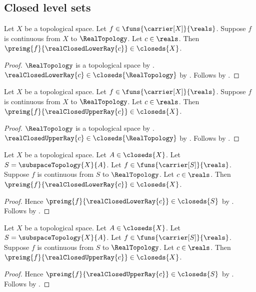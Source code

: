 \subsection{Closed level sets}

\begin{theorem}\label{continuous_closed_lower_level_set}
    Let $X$ be a topological space.
    Let $f\in\funs{\carrier[X]}{\reals}$.
    Suppose $f$ is continuous from $X$ to $\RealTopology$.
    Let $c\in\reals$.
    Then $\preimg{f}{\realClosedLowerRay{c}}\in\closeds{X}$.
\end{theorem}
\begin{proof}
    $\RealTopology$ is a topological space
        by .
    $\realClosedLowerRay{c}\in\closeds{\RealTopology}$
        by .
    Follows by .
\end{proof}

\begin{theorem}\label{continuous_closed_upper_level_set}
    Let $X$ be a topological space.
    Let $f\in\funs{\carrier[X]}{\reals}$.
    Suppose $f$ is continuous from $X$ to $\RealTopology$.
    Let $c\in\reals$.
    Then $\preimg{f}{\realClosedUpperRay{c}}\in\closeds{X}$.
\end{theorem}
\begin{proof}
    $\RealTopology$ is a topological space
        by .
    $\realClosedUpperRay{c}\in\closeds{\RealTopology}$
        by .
    Follows by .
\end{proof}

\begin{corollary}\label{continuous_closed_subspace_lower_level_set}
    Let $X$ be a topological space.
    Let $A\in\closeds{X}$.
    Let $S=\subspaceTopology{X}{A}$.
    Let $f\in\funs{\carrier[S]}{\reals}$.
    Suppose $f$ is continuous from $S$ to $\RealTopology$.
    Let $c\in\reals$.
    Then $\preimg{f}{\realClosedLowerRay{c}}\in\closeds{X}$.
\end{corollary}
\begin{proof}
    Hence
        $\preimg{f}{\realClosedLowerRay{c}}\in\closeds{S}$
        by .
    Follows by .
\end{proof}

\begin{corollary}\label{continuous_closed_subspace_upper_level_set}
    Let $X$ be a topological space.
    Let $A\in\closeds{X}$.
    Let $S=\subspaceTopology{X}{A}$.
    Let $f\in\funs{\carrier[S]}{\reals}$.
    Suppose $f$ is continuous from $S$ to $\RealTopology$.
    Let $c\in\reals$.
    Then $\preimg{f}{\realClosedUpperRay{c}}\in\closeds{X}$.
\end{corollary}
\begin{proof}
    Hence
        $\preimg{f}{\realClosedUpperRay{c}}\in\closeds{S}$
        by .
    Follows by .
\end{proof}
